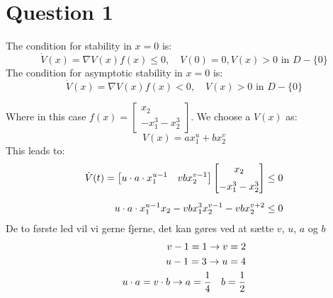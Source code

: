 \chapter{Question 1}

The condition for stability in $x = 0$ is:
\begin{equation}
  \dot{V}(x) = \nabla V(x) f(x) \leq 0,\quad V(0) = 0, V(x)>0 \text{ in } D - \{0\}
\end{equation}
The condition for asymptotic stability in $x = 0$ is:
\begin{equation}
  \dot{V}(x) = \nabla V(x) f(x) < 0,\quad  V(x)>0 \text{ in } D - \{0\}
\end{equation}

Where in this case $f(x) = \begin{bmatrix} x_2 \\[2mm] -x_{1}^{3} - x_{2}^3 \end{bmatrix}$. We choose a $V(x)$ as:
\begin{equation}
          V(x) = a x_{1}^{u} + b  x_{2}^{v}
\end{equation}
This leads to:
\begin{equation}
\begin{split}
        \dot{V}(t) = 
        \begin{bmatrix} 
        u \cdot a \cdot x_{1}^{u-1}  & v  b  x_{2}^{v-1} 
        \end{bmatrix}
        \begin{bmatrix} 
        x_2 \\[2mm]
        -x_{1}^{3} - x_{2}^3 
        \end{bmatrix}
        \leq 0 \\[2mm]
        u \cdot a \cdot x_{1}^{u-1}  x_2 - v  b  x_{1}^{3}  x_{2}^{v-1} - v  b  x_{2}^{v+2} \leq 0
\end{split}
\end{equation}
De to første led vil vi gerne fjerne, det kan gøres ved at sætte $v$, $u$, $a$ og $b$
\begin{equation}
\begin{split}
        v-1 = 1 \rightarrow v=2 \\
        u-1 = 3 \rightarrow u=4 \\
        u \cdot a = v \cdot b \rightarrow a=\frac{1}{4} \quad b=\frac{1}{2}
\end{split}
\end{equation}

